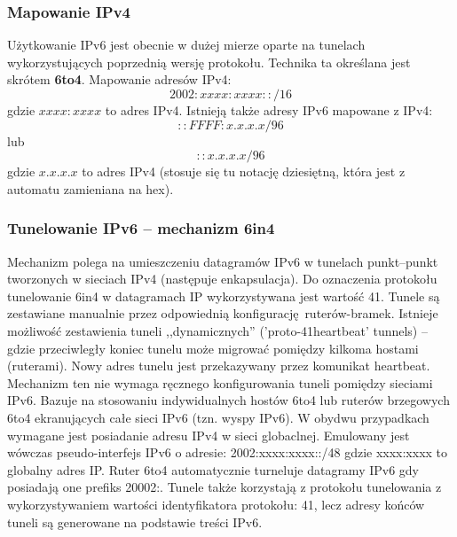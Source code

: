 \documentclass[a4paper, 12pt, titlepage]{article}
\begin{document}
			\subsubsection{Mapowanie IPv4}
				Użytkowanie IPv6 jest obecnie w dużej mierze oparte na tunelach wykorzystujących poprzednią wersję protokołu. Technika ta określana jest skrótem \textbf{6to4}. Mapowanie adresów IPv4:
				$$
					2002:xxxx:xxxx::/16
				$$
				gdzie $xxxx:xxxx$ to adres IPv4. Istnieją także adresy IPv6 mapowane z IPv4:
				$$
					::FFFF:x.x.x.x/96
				$$
				lub
				$$
					::x.x.x.x/96
				$$
				gdzie $x.x.x.x$ to adres IPv4 (stosuje się tu notację dziesiętną, która jest z automatu zamieniana na hex).
			\subsubsection{Tunelowanie IPv6 -- mechanizm 6in4}
				Mechanizm polega na umieszczeniu datagramów IPv6 w tunelach punkt--punkt tworzonych w sieciach IPv4 (następuje enkapsulacja). Do oznaczenia protokołu tunelowanie 6in4 w datagramach IP wykorzystywana jest wartość 41. Tunele są zestawiane manualnie przez odpowiednią konfigurację ruterów-bramek. Istnieje możliwość zestawienia tuneli ,,dynamicznych'' ('proto-41heartbeat' tunnels) -- gdzie przeciwległy koniec tunelu może migrować pomiędzy kilkoma hostami (ruterami). Nowy adres tunelu jest przekazywany przez komunikat heartbeat.
				\newline \newline 
				Mechanizm ten nie wymaga ręcznego konfigurowania tuneli pomiędzy sieciami IPv6. Bazuje na stosowaniu indywidualnych hostów 6to4 lub ruterów brzegowych 6to4 ekranujących całe sieci IPv6 (tzn. wyspy IPv6). W obydwu przypadkach wymagane jest posiadanie adresu IPv4 w sieci globaclnej. Emulowany jest wówczas pseudo-interfejs IPv6 o adresie: 2002:xxxx:xxxx::/48 gdzie xxxx:xxxx to globalny adres IP. Ruter 6to4 automatycznie turneluje datagramy IPv6 gdy posiadają one prefiks 20002:. 
				\newline \newline
				Tunele także korzystają z protokołu tunelowania z wykorzystywaniem wartości identyfikatora protokołu: 41, lecz adresy końców tuneli są generowane na podstawie treści IPv6.
\end{document}
